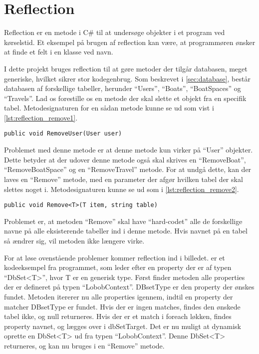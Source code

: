 \section{Reflection}
\label{sec:reflection}

Reflection er en metode i C\# til at undersøge objekter i et program ved kørselstid. Et eksempel på brugen af reflection kan være, at programmøren ønsker at finde et felt i en klasse ved navn.

I dette projekt bruges reflection til at gøre metoder der tilgår databasen, meget generiske, hvilket sikrer stor kodegenbrug. Som beskrevet i \cref{sec:database}, består databasen af forskellige tabeller, herunder \enquote{Users}, \enquote{Boats}, \enquote{BoatSpaces} og \enquote{Travels}. Lad os forestille os en metode der skal slette et objekt fra en specifik tabel. Metodesignaturen for en sådan metode kunne se ud som vist i \cref{lst:reflection_remove1}.


\begin{lstlisting}[label=lst:reflection_remove1]
public void RemoveUser(User user)
\end{lstlisting}

Problemet med denne metode er at denne metode kun virker på \enquote{User} objekter. Dette betyder at der udover denne metode også skal skrives en \enquote{RemoveBoat}, \enquote{RemoveBoatSpace} og en \enquote{RemoveTravel} metode. For at undgå dette, kan der laves en \enquote{Remove} metode, med en parameter der afgør hvilken tabel der skal slettes noget i. Metodesignaturen kunne se ud som i \cref{lst:reflection_remove2}.


\begin{lstlisting}[label=lst:reflection_remove2]
public void Remove<T>(T item, string table)
\end{lstlisting}

Problemet er, at metoden \enquote{Remove} skal have \enquote{hard-codet} alle de forskellige navne på alle eksisterende tabeller ind i denne metode. Hvis navnet på en tabel så ændrer sig, vil metoden ikke længere virke.

For at løse ovenstående problemer kommer reflection ind i billedet.  er et kodeeksempel fra programmet, som leder efter en property der er af typen \enquote{DbSet<T>}, hvor T er en generisk type. Først finder metoden alle properties der er defineret på typen \enquote{LobobContext}. DBsetType er den property der ønskes fundet. Metoden itererer nu alle properties igennem, indtil en property der matcher DBsetType er fundet. Hvis der er ingen matches, findes den ønskede tabel ikke, og null returneres. Hvis der er et match i foreach løkken, findes property navnet, og lægges over i dbSetTarget. Det er nu muligt at dynamisk oprette en DbSet<T> ud fra typen \enquote{LobobContext}. Denne DbSet<T> returneres, og kan nu bruges i en \enquote{Remove} metode.

